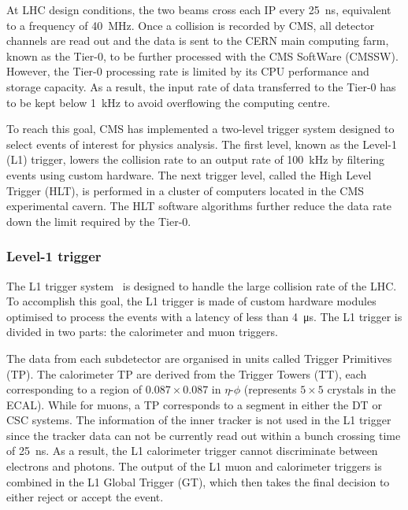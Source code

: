 At LHC design conditions, the two beams cross each IP every \SI{25}{\ns}, equivalent to a frequency of \SI{40}{\MHz}. Once a collision is recorded by CMS, all detector channels are read out and the data is sent to the CERN main computing farm, known as the Tier-0, to be further processed with the CMS SoftWare (CMSSW). However, the Tier-0 processing rate is limited by its CPU performance and storage capacity. As a result, the input rate of data transferred to the Tier-0 has to be kept below \SI{1}{\kHz} to avoid overflowing the computing centre.

To reach this goal, CMS has implemented a two-level trigger system designed to select events of interest for physics analysis. The first level, known as the Level-1 (L1) trigger, lowers the collision rate to an output rate of \SI{100}{\kHz} by filtering events using custom hardware. The next trigger level, called the High Level Trigger (HLT), is performed in a cluster of computers located in the CMS experimental cavern. The HLT software algorithms further reduce the data rate down the limit required by the Tier-0.

\subsubsection{Level-1 trigger}\label{sec:Experiment_CMS_Trigger_L1}

The L1 trigger system~\cite{CMSTrigger} is designed to handle the large collision rate of the LHC. To accomplish this goal, the L1 trigger is made of custom hardware modules optimised to process the events with a latency of less than \SI{4}{\us}. The L1 trigger is divided in two parts: the calorimeter and muon triggers.

The data from each subdetector are organised in units called Trigger Primitives (TP). The calorimeter TP are derived from the Trigger Towers (TT), each corresponding to a region of ${0.087}\times{0.087}$ in $\eta$-$\phi$ (represents $5\times{5}$ crystals in the ECAL). While for muons, a TP corresponds to a segment in either the DT or CSC systems. The information of the inner tracker is not used in the L1 trigger since the tracker data can not be currently read out within a bunch crossing time of \SI{25}{\ns}. As a result, the L1 calorimeter trigger cannot discriminate between electrons and photons. The output of the L1 muon and calorimeter triggers is combined in the L1 Global Trigger (GT), which then takes the final decision to either reject or accept the event.

